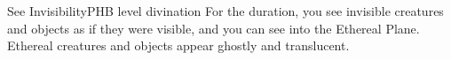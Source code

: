 \begin{spell}{See Invisibility}{PHB}{ level divination}
{
}
For the duration, you see invisible creatures and objects
as if they were visible, and you can see into the Ethereal
Plane. Ethereal creatures and objects appear ghostly
and translucent.
\end{spell}